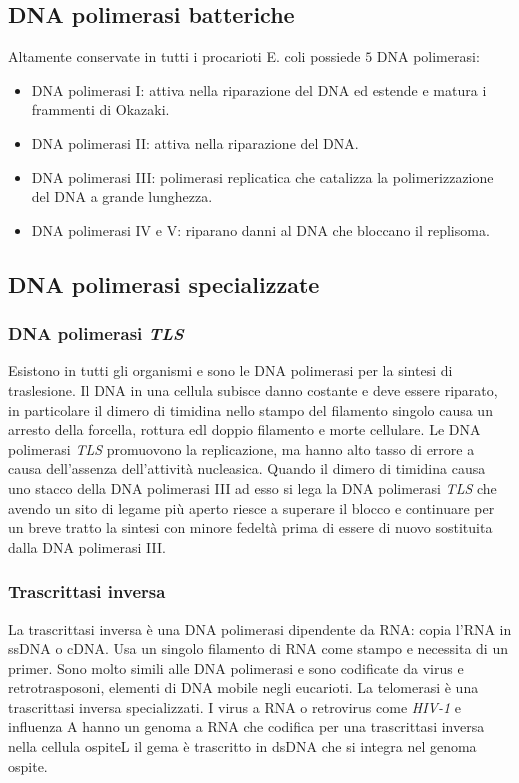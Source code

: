 \subsection{DNA polimerasi batteriche}
Altamente conservate in tutti i procarioti E. coli possiede $5$ DNA polimerasi:
\begin{itemize}
	\item DNA polimerasi I: attiva nella riparazione del DNA ed estende e matura i frammenti di Okazaki.
	\item DNA polimerasi II: attiva nella riparazione del DNA.
	\item DNA polimerasi III: polimerasi replicatica che catalizza la polimerizzazione del DNA a grande lunghezza.
	\item DNA polimerasi IV e V: riparano danni al DNA che bloccano il replisoma. 
\end{itemize}
\subsection{DNA polimerasi specializzate}
\subsubsection{DNA polimerasi \emph{TLS}}
Esistono in tutti gli organismi e sono le DNA polimerasi per la sintesi di traslesione. Il DNA in una cellula subisce danno costante e deve essere riparato, in particolare il dimero di 
timidina nello stampo del filamento singolo causa un arresto della forcella, rottura edl doppio filamento e morte cellulare. Le DNA polimerasi \emph{TLS} promuovono la replicazione, ma
hanno alto tasso di errore a causa dell'assenza dell'attivit\`a nucleasica. Quando il dimero di timidina causa uno stacco della DNA polimerasi III ad esso si lega la DNA polimerasi 
\emph{TLS} che avendo un sito di legame pi\`u aperto riesce a superare il blocco e continuare per un breve tratto la sintesi con minore fedelt\`a prima di essere di nuovo sostituita
dalla DNA polimerasi III. 
\subsubsection{Trascrittasi inversa}
La trascrittasi inversa \`e una DNA polimerasi dipendente da RNA: copia l'RNA in ssDNA o cDNA. Usa un singolo filamento di RNA come stampo e necessita di un primer. Sono molto simili
alle DNA polimerasi e sono codificate da virus e retrotrasposoni, elementi di DNA mobile negli eucarioti. La telomerasi \`e una trascrittasi inversa specializzati. I virus a RNA
o retrovirus come \emph{HIV-1} e influenza A hanno un genoma a RNA che codifica per una trascrittasi inversa nella cellula ospiteL il gema \`e trascritto in dsDNA che si integra 
nel genoma ospite. 

